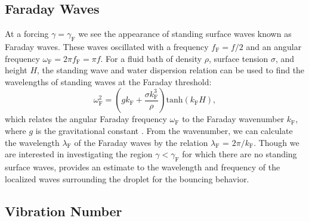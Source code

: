 \subsection{Faraday Waves}
	       At a forcing $\gamma = \gamma_\mathrm{F}$ we see the appearance of standing surface waves known as Faraday waves. These waves oscillated with a  frequency $f_\mathrm{F} = f/2$ and an angular frequency $\omega_\mathrm{F} = 2\pi f_\mathrm{F}=\pi f$. For a fluid bath of density $\rho$, surface tension $\sigma$, and height $H$, the standing wave and water dispersion relation can be used to find the wavelengths of standing waves at the Faraday threshold:
\begin{equation} \label{dispersion}
\omega_\mathrm{F}^2 = \left(gk_\mathrm{F}+\frac{\sigma k_\mathrm{F}^3}{\rho}\right)\mathrm{tanh}(k_\mathrm{F}H),
\end{equation} 
which relates the angular Faraday frequency $\omega_\mathrm{F}$ to the Faraday wavenumber $k_\mathrm{F}$, where $g$ is the gravitational constant . From the wavenumber, we can calculate the wavelength $\lambda_\mathrm{F}$ of the Faraday waves by the relation $\lambda_\mathrm{F}$ = $2\pi/k_\mathrm{F}$. Though we are interested in investigating the region $\gamma < \gamma_\mathrm{F}$ for which there are no standing surface waves,  provides an estimate to the wavelength and frequency of the localized waves surrounding the droplet for the bouncing behavior. 


\subsection{Vibration Number}

